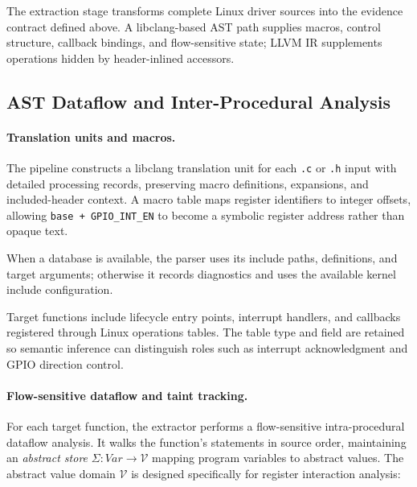 The extraction stage transforms complete Linux driver sources into the evidence contract defined above. A libclang-based AST path supplies macros, control structure, callback bindings, and flow-sensitive state; LLVM IR supplements operations hidden by header-inlined accessors.

\subsection{AST Dataflow and Inter-Procedural Analysis}

\paragraph{Translation units and macros.}

The pipeline constructs a libclang translation unit for each \texttt{.c} or \texttt{.h} input with detailed processing records, preserving macro definitions, expansions, and included-header context. A macro table maps register identifiers to integer offsets, allowing \texttt{base + GPIO\_INT\_EN} to become a symbolic register address rather than opaque text.

When a  database is available, the parser uses its include paths, definitions, and target arguments; otherwise it records diagnostics and uses the available kernel include configuration.

Target functions include lifecycle entry points, interrupt handlers, and callbacks registered through Linux operations tables. The table type and field are retained so semantic inference can distinguish roles such as interrupt acknowledgment and GPIO direction control.

\paragraph{Flow-sensitive dataflow and taint tracking.}

For each target function, the extractor performs a flow-sensitive intra-procedural dataflow analysis. It walks the function's statements in source order, maintaining an \emph{abstract store} $\Sigma: \mathit{Var} \rightarrow \mathcal{V}$ mapping program variables to abstract values. The abstract value domain $\mathcal{V}$ is designed specifically for register interaction analysis:

